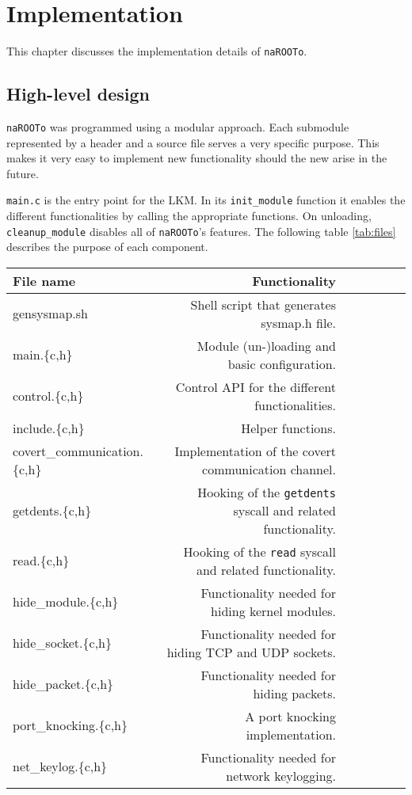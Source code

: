 \documentclass[10pt, letterpaper]{scrartcl}
\begin{document}
\section{Implementation}\label{sec:implementation}
This chapter discusses the implementation details of \texttt{naROOTo}. 

\subsection{High-level design}
\texttt{naROOTo} was programmed using a modular approach. Each submodule represented by a header and a source file serves a very specific purpose.
This makes it very easy to implement new functionality should the new arise in the future.

\texttt{main.c} is the entry point for the LKM. In its \texttt{init\_module} function it enables the different functionalities by calling the appropriate functions. On unloading, \texttt{cleanup\_module} disables all of \texttt{naROOTo}'s features.
The following table \ref{tab:files} describes the purpose of each component. \\



\begin{tabular}{l*{6}r}
File name             & Functionality \\
\hline
gensysmap.sh & Shell script that generates sysmap.h file.\\
main.\{c,h\} & Module (un-)loading and basic configuration.\\
control.\{c,h\} & Control API for the different functionalities.\\
include.\{c,h\} & Helper functions.\\
covert\_communication.\{c,h\} & Implementation of the covert communication channel.\\
getdents.\{c,h\} & Hooking of the \texttt{getdents} syscall and related functionality.\\
read.\{c,h\} & Hooking of the \texttt{read} syscall and related functionality.\\
hide\_module.\{c,h\} & Functionality needed for hiding kernel modules.\\
hide\_socket.\{c,h\} & Functionality needed for hiding TCP and UDP sockets.\\
hide\_packet.\{c,h\} & Functionality needed for hiding packets. \\
port\_knocking.\{c,h\} & A port knocking implementation.\\
net\_keylog.\{c,h\} & Functionality needed for network keylogging.\\

\end{tabular}
\end{document}

